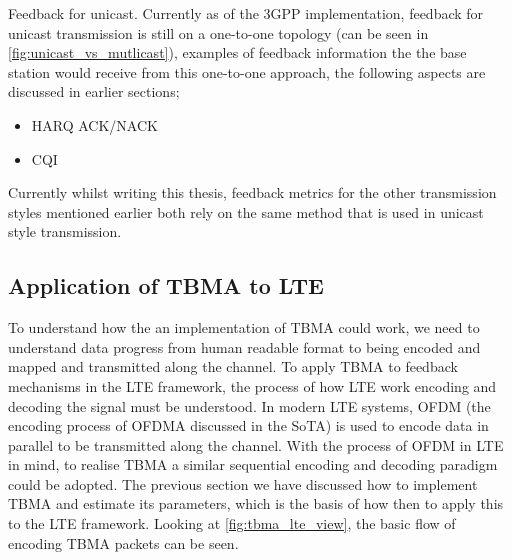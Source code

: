 \documentclass{article}
\begin{document}

Feedback for unicast. Currently as of the 3GPP implementation, feedback for unicast transmission is still on a one-to-one topology (can be seen in \cref{fig:unicast_vs_mutlicast}), examples of feedback information the the base station would receive from this one-to-one approach, the following aspects are discussed in earlier sections;
\begin{itemize}
    \item HARQ ACK/NACK
    \item CQI
\end{itemize}

Currently whilst writing this thesis, feedback metrics for the other transmission styles mentioned earlier both rely on the same method that is used in unicast style transmission. 

\subsection{Application of TBMA to LTE}

To understand how the an implementation of TBMA could work, we need to understand data progress from human readable format to being encoded and mapped and transmitted along the channel.
To apply TBMA to feedback mechanisms in the LTE framework, the process of how LTE work encoding and decoding the signal must be understood. In modern LTE systems, OFDM (the encoding process of OFDMA discussed in the SoTA) is used to encode data in parallel to be transmitted along the channel. With the process of OFDM in LTE in mind, to realise TBMA a similar sequential encoding and decoding paradigm could be adopted. The previous section we have discussed how to implement TBMA and estimate its parameters, which is the basis of how then to apply this to the LTE framework. Looking at  \cref{fig:tbma_lte_view}, the basic flow of encoding TBMA packets can be seen. 
\end{document}
